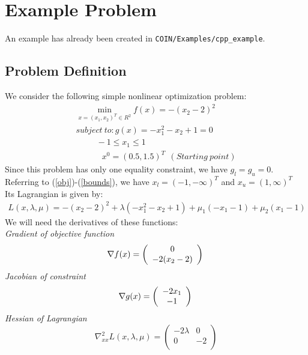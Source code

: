 \documentclass[letter,12pt]{article}
\begin{document}
\section{Example Problem}
An example has already been created in {\tt COIN/Examples/cpp\_example}.
\subsection{Problem Definition}
 We consider the following simple nonlinear optimization
problem:
\begin{eqnarray}
\min_{x=(x_1,x_2)^T \in R^2} f(x) = -(x_2-2)^2\\
subject~to: g(x)=-x_1^2 - x_2 + 1=0\\
~~~~~~~~~~~-1 \leq x_1 \leq 1 \label{ExampleBound}\\
~~~~~~~~~~~~~~x^0=(0.5,1.5)^T~~(Starting~point)
\end{eqnarray}
Since this problem has only one equality constraint, we have
$g_l=g_u=0$. Referring to (\ref{obj})-(\ref{bounds}), we have
$x_l=(-1,-\infty)^T$ and $x_u=(1,\infty)^T$\\
Its Lagrangian is given by:
\begin{eqnarray}
L(x,\lambda,\mu)=-(x_2-2)^2+\lambda(-x_1^2 - x_2 + 1)+\mu_{1}(-x_1-1)+\mu_{2}(x_1-1)
\end{eqnarray}
We will need the derivatives of these functions:\\
\textit{Gradient of objective function}\\
\begin{equation}
\nabla f(x)=\left(\begin{array}{c}0\\-2(x_2-2)\\\end{array}\right)\\
\end{equation}
\textit{Jacobian of constraint}\\
\begin{equation}
\nabla g(x)=\left(\begin{array}{c}-2x_1\\-1\\\end{array}\right)\\
\end{equation}
\textit{Hessian of Lagrangian}\\
\begin{equation}
\nabla^2_{xx} L(x,\lambda, \mu)=\left(\begin{array}{cc}-2\lambda & 0 \\0
				      & -2\\\end{array}\right)
\end{equation}
\end{document}
